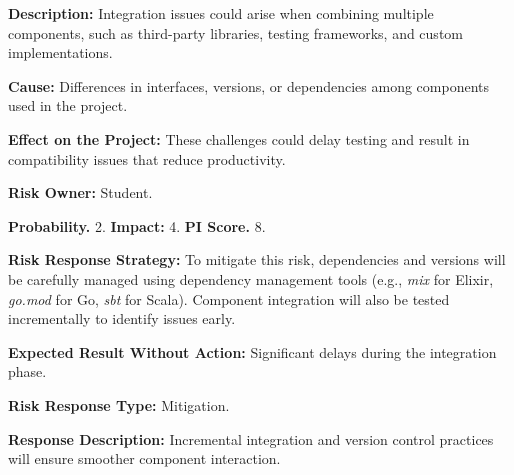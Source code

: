 \textbf{Description:} Integration issues could arise when combining multiple components, such as third-party libraries, testing frameworks, and custom implementations.

\textbf{Cause:} Differences in interfaces, versions, or dependencies among components used in the project.

\textbf{Effect on the Project:} These challenges could delay testing and result in compatibility issues that reduce productivity.

\textbf{Risk Owner:} Student.

\textbf{Probability.} 2. \textbf{Impact:} 4. \textbf{PI Score.} 8.

\textbf{Risk Response Strategy:} To mitigate this risk, dependencies and versions will be carefully managed using dependency management tools (e.g., \textit{mix} for Elixir, \textit{go.mod} for Go,  \textit{sbt} for Scala). Component integration will also be tested incrementally to identify issues early.

\textbf{Expected Result Without Action:} Significant delays during the integration phase.

\textbf{Risk Response Type:} Mitigation.

\textbf{Response Description:} Incremental integration and version control practices will ensure smoother component interaction.